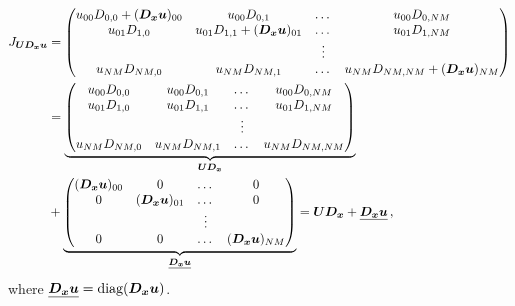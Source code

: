 \begin{equation*}
\begin{aligned}
  J_{\bm{U}\bm{D_x}\bm{u}} & = 
  \begin{pmatrix}
    u_{00} D_{0,0} + (\bm{D_x} \bm{u})_{00}& u_{00} D_{0,1} & \dots & u_{00}D_{0,NM}
    \\
    u_{01} D_{1,0} & u_{01} D_{1,1} + (\bm{D_x} \bm{u})_{01} & \dots & u_{01}D_{1,NM}
    \\
    && \vdots
    \\
    u_{NM} D_{NM,0} & u_{NM} D_{NM,1} & \dots & u_{NM}D_{NM,NM} + (\bm{D_x} \bm{u})_{NM}
  \end{pmatrix}
  \\
  & = 
  \underbrace{
  \begin{pmatrix}
    u_{00} D_{0,0} & u_{00} D_{0,1} & \dots & u_{00}D_{0,NM}
    \\
    u_{01} D_{1,0} & u_{01} D_{1,1}  & \dots & u_{01}D_{1,NM}
    \\
    && \vdots
    \\
    u_{NM} D_{NM,0} & u_{NM} D_{NM,1} & \dots & u_{NM}D_{NM,NM}
  \end{pmatrix}
  }_{\bm{U} \bm{D_x}}
  \\
  & +
  \underbrace{
  \begin{pmatrix}
    (\bm{D_x} \bm{u})_{00} & 0 & \dots & 0
    \\
    0 & (\bm{D_x} \bm{u})_{01} & \dots & 0
    \\
    && \vdots
    \\
    0 &  0 & \dots & (\bm{D_x} \bm{u})_{NM}
  \end{pmatrix}
  }_{\underline{\bm{D_x} \bm{u}}}
  = \bm{U} \bm{D_x} + \underline{\bm{D_x} \bm{u}}
  \, ,
\end{aligned}
\end{equation*}
where $\underline{\bm{D_x} \bm{u}} = \text{diag}(\bm{D_x} \bm{u})$.

